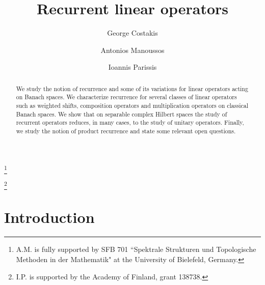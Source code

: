\documentclass[12pt,leqno]{amsart}
\theoremstyle{plain}
\theoremstyle{definition}
\numberwithin{equation}{section}
\begin{document}
\raggedbottom
\title[Recurrent linear operators]{Recurrent linear operators}

\author[G. Costakis]{George Costakis} \address{G.C: Department of Mathematics, University of Crete, Knossos Avenue, GR-714 09 Heraklion, Crete, Greece.}  
\author[A. Manoussos]{Antonios Manoussos} \address{A.M.: Fakult\"{a}t f\"{u}r Mathematik, SFB 701, Universit\"{a}t Bielefeld, Postfach 100131, D-33501 Bielefeld, Germany}  \thanks{A.M. is fully supported by SFB 701 ``Spektrale Strukturen und Topologische Methoden in der Mathematik" at the University of Bielefeld, Germany.}
\author[I. Parissis]{Ioannis Parissis} \address{I.P.: Department of Mathematics, Aalto University, P.O.Box 11100, FI-00076 Aalto, Finland}  \thanks{I.P. is supported by the Academy of Finland, grant 138738.}

  
\begin{abstract}
	We study the notion of recurrence and some of its variations for linear operators acting on Banach spaces. We characterize recurrence for several classes of linear operators such as weighted shifts, composition operators and multiplication operators on classical Banach spaces. We show that on separable complex Hilbert spaces the study of recurrent operators reduces, in many cases, to the study of unitary operators. Finally, we study the notion of product recurrence and state some relevant open questions. 
\end{abstract}
\maketitle
\tableofcontents

\section{Introduction} \label{s.intro}
\end{document}
